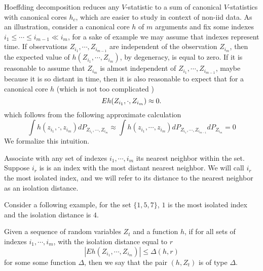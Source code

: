 Hoeffding decomposition reduces any $V$-statistic to a sum of canonical $V$-statistics with canonical cores $h_c$, which are easier to study in context of  non-iid data. As an illustration, consider a canonical core $h$ of $m$ arguments and fix some indexes  $i_1 \leq  \cdots \leq i_{m-1} \ll i_m $, for a sake of  example we may assume that indexes represent time. If observations $Z_{i_1}, \cdots, Z_{i_{m-1}}$ are independent of the observation $Z_{i_m}$, then the expected value of $h(Z_{i_1}, \cdots, Z_{i_m})$, by degeneracy, is equal to zero. If it is reasonable to assume that $Z_{i_m}$ is almost independent of $Z_{i_1}, \cdots, Z_{i_{m-1}}$, maybe because it is so distant in time, then it is also reasonable to expect that for a canonical core $h$ (which is not too complicated ) 
\[
 E h(Z_{i_1}, \cdot, Z_{i_m}) \approx 0.
\]
which follows from the following approximate calculation
\[
 \int h(z_{i_1}, \cdot, z_{i_m}) dP_{Z_{i_1}, \cdots, Z_{i_m}} \approx  \int h(z_{i_1}, \cdots, z_{i_m}) dP_{Z_{i_1}, \cdots, Z_{i_{m-1}}} dP_{Z_{i_m}} =0
\]
We formalize this intuition.
\begin{definition}
 Associate with  any  set of indexes $ i_1,\cdots,i_m$ its nearest neighbor within the set. Suppose $i_r$ is is an index with the most distant nearest neighbor. We will call $i_r$ the most isolated index, and we will refer to its distance to the nearest neighbor as an isolation distance.
\end{definition}
Consider a following example, for the set $\{1,5,7\}$, $1$ is the most isolated index and the isolation distance is $4$.
\begin{definition}
\label{isolation}
\label{def:varDelta}
 Given a sequence of random variables $Z_{t} $ and a function $h$, if for all sets of indexes $i_1,\cdots,i_m$, with the isolation distance equal to $r$ 
 \[
  |E h(Z_{i_1}, \cdots, Z_{i_m})| \leq \varDelta(h,r)
 \]
 for some some function $\varDelta$, then we say that the pair $(h,Z_{t})$ is of type $\varDelta$. 
\end{definition}

